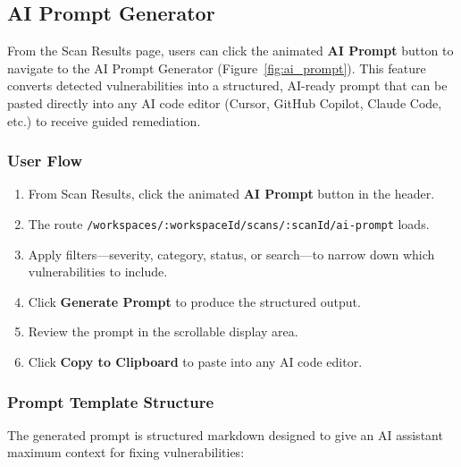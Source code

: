 \documentclass[12pt,a4paper]{report}
\begin{document}
\subsection{AI Prompt Generator}

From the Scan Results page, users can click the animated \textbf{AI Prompt} button to navigate to the AI Prompt Generator (Figure~\ref{fig:ai_prompt}). This feature converts detected vulnerabilities into a structured, AI-ready prompt that can be pasted directly into any AI code editor (Cursor, GitHub Copilot, Claude Code, etc.) to receive guided remediation.

\subsubsection{User Flow}

\begin{enumerate}
    \item From Scan Results, click the animated \textbf{AI Prompt} button in the header.
    \item The route \texttt{/workspaces/:workspaceId/scans/:scanId/ai-prompt} loads.
    \item Apply filters---severity, category, status, or search---to narrow down which vulnerabilities to include.
    \item Click \textbf{Generate Prompt} to produce the structured output.
    \item Review the prompt in the scrollable display area.
    \item Click \textbf{Copy to Clipboard} to paste into any AI code editor.
\end{enumerate}

\subsubsection{Prompt Template Structure}

The generated prompt is structured markdown designed to give an AI assistant maximum context for fixing vulnerabilities:
\end{document}
